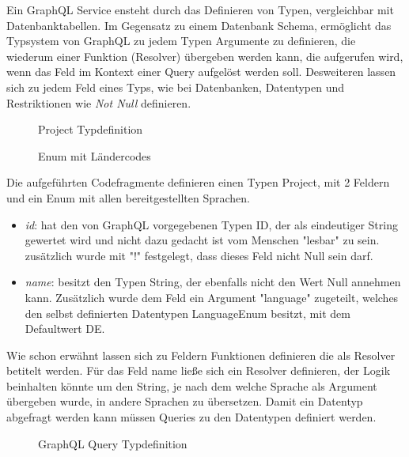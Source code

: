 Ein GraphQL Service ensteht durch das Definieren von Typen, vergleichbar mit Datenbanktabellen. Im Gegensatz zu einem Datenbank Schema,
ermöglicht das Typsystem von GraphQL zu jedem Typen Argumente zu definieren, die wiederum einer Funktion (Resolver) übergeben werden kann, die aufgerufen wird, wenn das Feld
im Kontext einer Query aufgelöst werden soll. Desweiteren lassen sich zu jedem Feld eines Typs, wie bei Datenbanken, Datentypen und Restriktionen wie \emph{Not Null} definieren.

\begin{figure}[h]
    
    \caption{Project Typdefinition}
    \label{fig:basics:graphql:1}
\end{figure}

\begin{figure}[h]
    
    \caption{Enum mit Ländercodes}
    \label{fig:basics:graphql:2}
\end{figure}

Die aufgeführten Codefragmente definieren einen Typen Project, mit 2 Feldern und ein Enum mit allen bereitgestellten Sprachen.

\begin{itemize}
    \item \emph{id}: hat den von GraphQL vorgegebenen Typen ID, der als eindeutiger String gewertet wird und nicht dazu gedacht ist vom Menschen "lesbar" zu sein.
    zusätzlich wurde mit "!" festgelegt, dass dieses Feld nicht Null sein darf.
    \item \emph{name}: besitzt den Typen String, der ebenfalls nicht den Wert Null annehmen kann. Zusätzlich wurde dem Feld ein Argument "language" zugeteilt,
    welches den selbst definierten Datentypen LanguageEnum besitzt, mit dem Defaultwert DE.
\end{itemize}

Wie schon erwähnt lassen sich zu Feldern Funktionen definieren die als Resolver betitelt werden.
Für das Feld name ließe sich ein Resolver definieren, der Logik beinhalten könnte um den String, je nach dem welche Sprache als Argument übergeben wurde,
in andere Sprachen zu übersetzen.
Damit ein Datentyp abgefragt werden kann müssen Queries zu den Datentypen definiert werden.

\begin{figure}[h]
    
    \caption{GraphQL Query Typdefinition}
    \label{fig:basics:graphql:3}
\end{figure}


